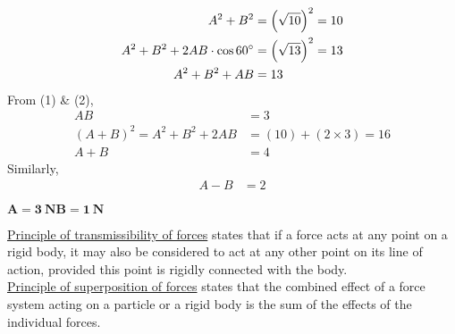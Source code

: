 \documentclass[12pt]{ipu-mechanics}
\begin{document}
    \begin{align}
        A^2 + B^2 &= \left(\sqrt{10}\right)^2 = 10\\
        A^2 + B^2 + 2AB\cdot\cos{60\degree} &= \left(\sqrt{13}\right)^2 = 13\nonumber\\
        A^2 + B^2 + AB &= 13
    \end{align}
    \hspace*{0.3\textwidth}From (1) \& (2),\vspace*{-5pt}
    \begin{align*}
        AB &= 3\\
        (A+B)^2 = A^2 + B^2 + 2AB &= (10) + (2\times{3}) = 16\\
        A+B &= 4
    \end{align*}
    \hspace*{0.3\textwidth}Similarly,\vspace*{-5pt}
    \begin{align*}
        A-B &= 2
    \end{align*}\vspace*{-20pt}
    \parbox{\textwidth}{\centering
        $\bm{\boxed{A = 3~\text{N}}\boxed{B = 1~\text{N}}}$
    }
    \cleardoublepage



    \noindent \underline{Principle of transmissibility of forces} states that if a force acts at any point on a rigid
    body, it may also be considered to act at any other point on its line of action, provided this point is rigidly
    connected with the body.\\

    \noindent\underline{Principle of superposition of forces} states that the combined effect of a force system acting
    on a particle or a rigid body is the sum of the effects of the individual forces.
\end{document}
